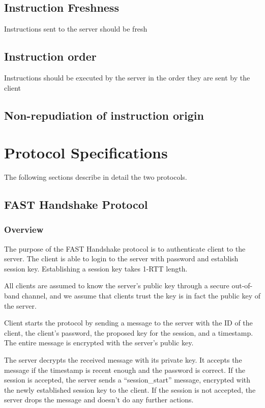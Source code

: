 \documentclass[12pt]{article}
\begin{document}
\subsection{Instruction Freshness}
Instructions sent to the server should be fresh

\subsection{Instruction order}
Instructions should be executed by the server in the order they are sent by the client

\subsection{Non-repudiation of instruction origin}

\newpage

\section{Protocol Specifications}
The following sections describe in detail the two protocols.

\subsection{FAST Handshake Protocol}

\subsubsection{Overview}
The purpose of the FAST Handshake protocol is to authenticate client to the server. The client is able to login to the server with password and establish session key. Establishing a session key takes 1-RTT length.

All clients are assumed to know the server’s public key through a secure out-of-band channel, and we assume that clients trust the key is in fact the public key of the server.

Client starts the protocol by sending a message to the server with the ID of the client, the client’s password, the proposed key for the session, and a timestamp. The entire message is encrypted with the server’s public key.

The server decrypts the received message with its private key. It accepts the message if the timestamp is recent enough and the password is correct. If the session is accepted, the server sends a “session\_start” message, encrypted with the newly established session key to the client.  If the session is not accepted, the server drops the message and doesn't do any further actions.
\end{document}
